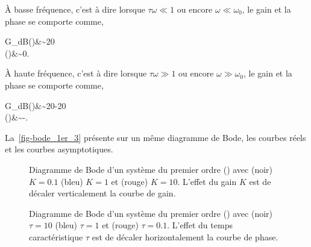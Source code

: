 \`A basse fréquence, c'est à dire lorsque $\tau\omega\ll1$ ou 
encore $\omega\ll\omega_0$, le gain et la phase se comporte comme, 
\begin{bequation}
    G_{dB}(\omega)&\sim20 \\
    \phi(\omega)&\sim0\degreeSI.
\end{bequation} 
\`A haute fréquence, c'est à dire lorsque $\tau\omega\gg1$ ou 
encore $\omega\gg\omega_0$, le gain et la phase se comporte comme,
\begin{bequation}
    G_{dB}(\omega)&\sim20-20 \\
    \phi(\omega)&\sim-.
\end{bequation} 
La~\cref{fig-bode_1er_3} présente sur un même diagramme de Bode, les courbes 
réels et les courbes asymptotiques.
\begin{figure}[!t]
    \centering
    

    
    \caption{Diagramme de Bode d'un système du premier ordre 
             () avec (noir) $K=0.1$ (bleu) $K=1$ et 
             (rouge) $K=10$. L'effet du gain $K$ est de décaler verticalement 
             la courbe de gain.\label{fig-bode_1er_1}}
\end{figure}
\begin{figure}[!b]
    \centering
    

    
    \caption{Diagramme de Bode d'un système du premier ordre 
             () avec (noir) $\tau=10$ (bleu) $\tau=1$ et 
             (rouge) $\tau=0.1$. L'effet du temps caractéristique $\tau$ est 
             de décaler horizontalement la courbe de phase.
             \label{fig-bode_1er_2}}
\end{figure}
